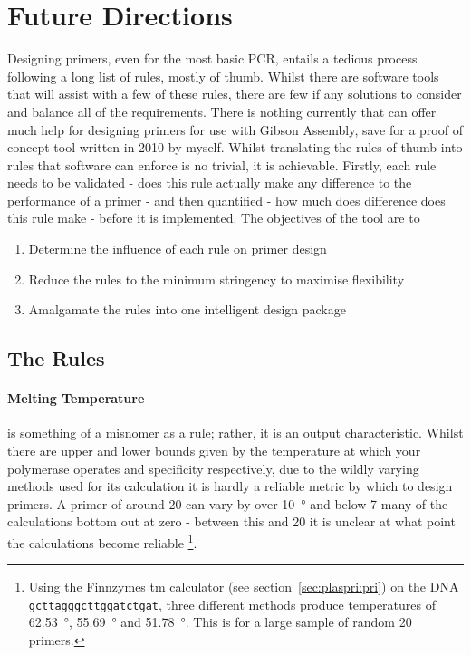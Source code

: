 \documentclass[../main.tex]{subfiles}
\begin{document}
\section{Future Directions}

Designing primers, even for the most basic PCR, entails a tedious process following a long list of rules, mostly of thumb. Whilst there are software tools that will assist with a few of these rules, there are few if any solutions to consider and balance all of the requirements. There is nothing currently that can offer much help for designing primers for use with Gibson Assembly, save for a proof of concept tool written in 2010 by myself. Whilst translating the rules of thumb into rules that software can enforce is no trivial, it is achievable. Firstly, each rule needs to be validated - does this rule actually make any difference to the performance of a primer - and then quantified - how much does difference does this rule make - before it is implemented. The objectives of the tool are to 
\begin{enumerate}
\item{Determine the influence of each rule on primer design}
\item{Reduce the rules to the minimum stringency to maximise flexibility}
\item{Amalgamate the rules into one intelligent design package}
\end{enumerate}

\subsection{The Rules}

\paragraph{Melting Temperature} is something of a misnomer as a rule; rather, it is an output characteristic. Whilst there are upper and lower bounds given by the temperature at which your polymerase operates and specificity respectively, due to the wildly varying methods used for its calculation it is hardly a reliable metric by which to design primers. A primer of around \SI{20}{\base} can vary by over \SI{10}{\degree} and below \SI{7}{\base} many of the calculations bottom out at zero - between this and \SI{20}{\base} it is unclear at what point the calculations become reliable \footnote{Using the Finnzymes tm calculator (see section~\ref{sec:plaspri:pri}) on the DNA \texttt{gcttagggcttggatctgat}, three different methods produce temperatures of \SI{62.53}{\degree}, \SI{55.69}{\degree} and \SI{51.78}{\degree}. This is for a large sample of random \SI{20}{\base} primers.}.
\end{document}
